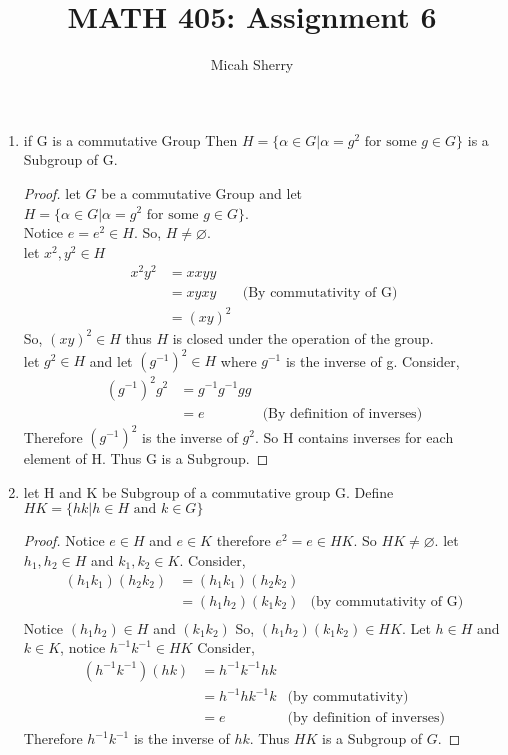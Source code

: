 \documentclass{article}
\title{MATH 405: Assignment 6}
\author{Micah Sherry}
\newcommand{\nullset}{\varnothing}
\begin{document}
	\maketitle
	\begin{enumerate}
		\item if G is a commutative Group Then $H =\{\alpha \in G |\alpha = g^2 \text{ for some } g \in G\}$ is a Subgroup of G.
		\begin{proof}
			let $G$ be a commutative Group and let $H =\{\alpha \in G |\alpha = g^2 \text{ for some } g \in G\}$.
			\\
			Notice $e = e^2 \in H$. So, $H \neq \nullset$.\\ let $x^2, y^2 \in H$
			\begin{align*}
				x^2y^2  &= xxyy\\
						&= xyxy &\text{(By commutativity of G)}\\
						&= (xy)^2
			\end{align*}
			So, $(xy)^2 \in H$ thus $H$ is closed under the operation of the group.\\
			let $g^2 \in H$ and let $(g^{-1})^2 \in H$ where $g^{-1}$ is the inverse of g.  
			Consider,
			\begin{align*}
				(g^{-1})^2g^2   &= g^{-1}g^{-1}gg \\
								&= e  &\text{(By definition of inverses)} 
			\end{align*}
			Therefore $(g^{-1})^2$ is the inverse of $g^2$. So H contains inverses for each element of H. Thus G is a Subgroup. 
		\end{proof}

		\item let H and K be Subgroup of a commutative group G. Define $HK = \{hk| h \in H \text{ and } k \in G\}$
		\begin{proof}
			Notice $e \in H $ and $e \in K$ therefore $e^2 = e \in HK$. So $HK \neq \nullset$.
			let $h_1, h_2 \in H$ and $k_1, k_2 \in K$. 
			Consider,
			\begin{align*}
				(h_1k_1)(h_2k_2)&=(h_1k_1)(h_2k_2)\\
								&= (h_1h_2)(k_1k_2) &\text{(by commutativity of G)}\\			
			\end{align*}
			Notice $(h_1h_2)\in H $ and $ (k_1k_2)$ So, $(h_1h_2)(k_1k_2) \in HK$.
			Let $h \in H$ and $k \in K$, notice $h^{-1}k^{-1} \in HK$ Consider,
			\begin{align*}
				(h^{-1}k^{-1})(hk) &= h^{-1}k^{-1}hk\\
									&= h^{-1}hk^{-1}k &\text{(by commutativity)}\\
									&= e &\text{(by definition of inverses)}
			\end{align*} 
			Therefore $h^{-1}k^{-1}$ is the inverse of $hk$. Thus $HK$ is a Subgroup of $G$.
		\end{proof}


\end{enumerate}
\end{document}
